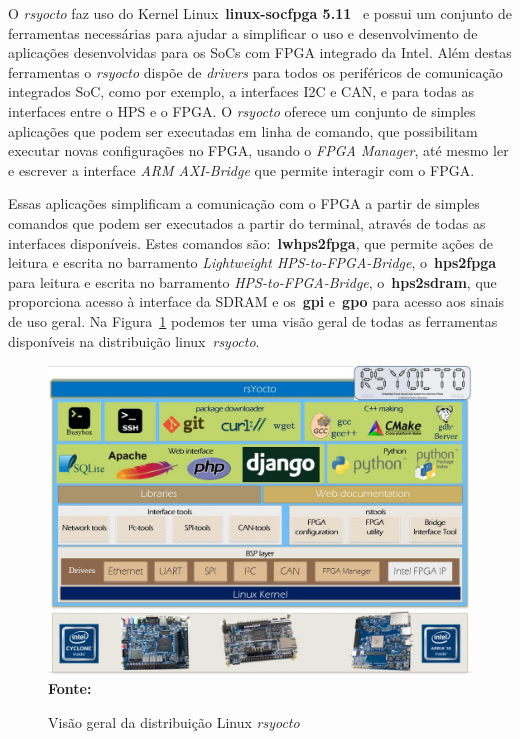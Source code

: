 O \textit{rsyocto} faz uso do Kernel Linux~\textbf{linux-socfpga 5.11}~\cite{linuxsocfpga} e possui um conjunto de ferramentas necessárias para ajudar a simplificar o uso e desenvolvimento de aplicações desenvolvidas para os SoCs com FPGA integrado da Intel. Além destas ferramentas o \textit{rsyocto} dispõe de \textit{drivers} para todos os periféricos de comunicação integrados SoC, como por exemplo, a interfaces I2C e CAN, e para todas as interfaces entre o HPS e o FPGA\@. O \textit{rsyocto} oferece um conjunto de simples aplicações que podem ser executadas em linha de comando, que possibilitam executar novas configurações no FPGA, usando o \textit{FPGA Manager}, até mesmo ler e escrever a interface \textit{ARM AXI-Bridge} que permite interagir com o FPGA\@. 

Essas aplicações simplificam a comunicação com o FPGA a partir de simples comandos que podem ser executados a partir do terminal, através de todas as interfaces disponíveis. Estes comandos são:~\textbf{lwhps2fpga}, que permite ações de leitura e escrita no barramento \textit{Lightweight HPS-to-FPGA-Bridge}, o~\textbf{hps2fpga} para leitura e escrita no barramento \textit{HPS-to-FPGA-Bridge}, o~\textbf{hps2sdram}, que proporciona acesso à interface da SDRAM e os~\textbf{gpi} e~\textbf{gpo} para acesso aos sinais de uso geral. Na Figura~\ref{fig:rsyocto} podemos ter uma visão geral de todas as ferramentas disponíveis na distribuição linux~\textit{rsyocto}.


\begin{figure}[ht]
	\caption{Visão geral da distribuição Linux \textit{rsyocto}}
	\begin{center}
		\includegraphics[scale=0.45]{imagens/rsYoctoLayers.jpg}\\
		{\small \textbf{Fonte:}\cite{rsyocto}}
    \end{center}\label{fig:rsyocto}
\end{figure}

